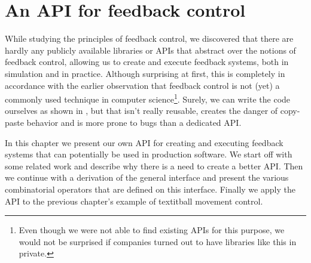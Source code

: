 \chapter{An API for feedback control}
\label{chap:feedback-api}
While studying the principles of feedback control, we discovered that there are hardly any publicly available libraries or APIs that abstract over the notions of feedback control, allowing us to create and execute feedback systems, both in simulation and in practice. Although surprising at first, this is completely in accordance with the earlier observation that feedback control is not (yet) a commonly used technique in computer science\footnote{Even though we were not able to find existing APIs for this purpose, we would not be surprised if companies turned out to have libraries like this in private.}. Surely, we can write the code ourselves as shown in , but that isn't really reusable, creates the danger of copy-paste behavior and is more prone to bugs than a dedicated API.

In this chapter we present our own API for creating and executing feedback systems that can potentially be used in production software. We start off with some related work and describe why there is a need to create a better API. Then we continue with a derivation of the general interface and present the various combinatorial operators that are defined on this interface. Finally we apply the API to the previous chapter's example of textit{ball movement control}.







































































